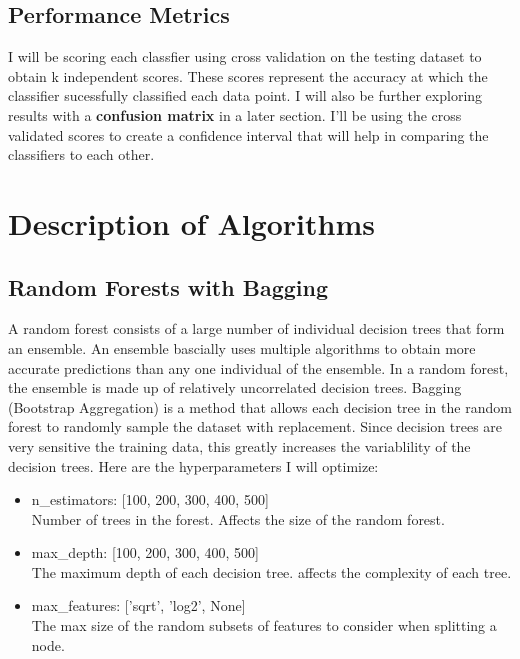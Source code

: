 \documentclass[12pt]{article}
\begin{document}
\subsection{Performance Metrics}
I will be scoring each classfier using cross validation on the testing dataset to obtain k independent scores. These scores represent the accuracy at which the classifier sucessfully classified each data point. I will also be further exploring results with a \textbf{confusion matrix} in a later section. I'll be using the cross validated scores to create a confidence interval that will help in comparing the classifiers to each other.

\section{Description of Algorithms}
\subsection{Random Forests with Bagging}
A random forest consists of a large number of individual decision trees that form an ensemble. An ensemble bascially uses multiple algorithms to obtain more accurate predictions than any one individual of the ensemble. In a random forest, the ensemble is made up of relatively uncorrelated decision trees. Bagging (Bootstrap Aggregation) is a method that allows each decision tree in the random forest to randomly sample the dataset with replacement. Since decision trees are very sensitive the training data, this greatly increases the variablility of the decision trees. Here are the hyperparameters I will optimize:
\begin{itemize}
    \item n\_estimators: [100, 200, 300, 400, 500]
    \\ Number of trees in the forest. Affects the size of the random forest.
    \item max\_depth: [100, 200, 300, 400, 500]
    \\ The maximum depth of each decision tree. affects the complexity of each tree.
    \item max\_features: ['sqrt', 'log2', None]
    \\ The max size of the random subsets of features to consider when splitting a node.
\end{itemize}
\end{document}
